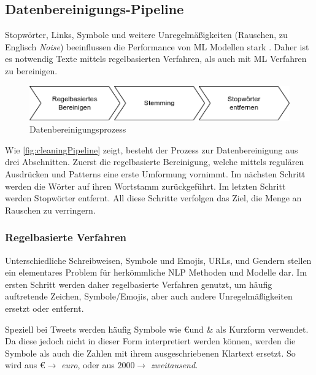 \subsection{Datenbereinigungs-Pipeline} \label{subsec:cleaningPipeline}

Stopwörter, Links, Symbole und weitere Unregelmäßigkeiten (Rauschen, zu Englisch \textit{Noise}) beeinflussen die Performance von \ac{ML} Modellen stark \autocite[4]{kowsari_text_2019}. Daher ist es notwendig Texte mittels regelbasierten Verfahren, als auch mit \ac{ML} Verfahren zu bereinigen. 


\begin{figure}[H]
    \centering
    \includegraphics[width=0.7\linewidth]{data/images/cleaning_pipeline_v1.png}
    \caption{Datenbereinigungsprozess} \label{fig:cleaningPipeline}
\end{figure}

Wie \autoref{fig:cleaningPipeline} zeigt, besteht der Prozess zur Datenbereinigung aus drei Abschnitten. Zuerst die regelbasierte Bereinigung, welche mittels regulären Ausdrücken und Patterns eine erste Umformung vornimmt. Im nächsten Schritt werden die Wörter auf ihren Wortstamm zurückgeführt. Im letzten Schritt werden Stopwörter entfernt. All diese Schritte verfolgen das Ziel, die Menge an Rauschen zu verringern. 

\subsubsection{Regelbasierte Verfahren}

Unterschiedliche Schreibweisen, Symbole und Emojis, \acp{URL}, und Gendern stellen ein elementares Problem für herkömmliche \ac{NLP} Methoden und Modelle dar. Im ersten Schritt werden daher regelbasierte Verfahren genutzt, um häufig auftretende Zeichen, Symbole/Emojis, aber auch andere Unregelmäßigkeiten ersetzt oder entfernt.

Speziell bei Tweets werden häufig Symbole wie \euro und \& als Kurzform verwendet. Da diese jedoch nicht in dieser Form interpretiert werden können, werden die Symbole als auch die Zahlen mit ihrem ausgeschriebenen Klartext ersetzt. So wird aus \euro \(\rightarrow\) \textit{euro}, oder aus \(\num{2000} \rightarrow\) \textit{zweitausend}.

